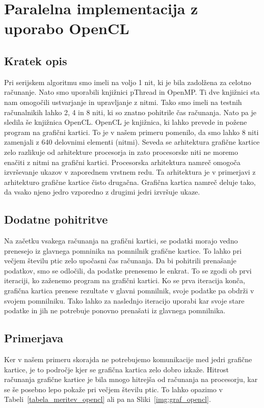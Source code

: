 \documentclass[a4paper, 12pt]{book}
\begin{document}
\chapter{Paralelna implementacija z uporabo OpenCL}
\label{ch4}
\section{Kratek opis}
Pri serijskem algoritmu smo imeli na voljo 1 nit, ki je bila zadolžena za celotno računanje. Nato smo uporabili knjižnici pThread in OpenMP. Ti dve knjižnici sta nam omogočili ustvarjanje in upravljanje z nitmi. Tako smo imeli na testnih računalnikih lahko 2, 4 in 8 niti, ki so znatno pohitrile čas računanja. Nato pa je sledila še knjižnica OpenCL. OpenCL je knjižnica, ki lahko prevede in požene program na grafični kartici. To je v našem primeru pomenilo, da smo lahko 8 niti zamenjali z 640 delovnimi elementi (nitmi). Seveda se arhitektura grafične kartice zelo razlikuje od arhitekture procesorja in zato procesorske niti ne moremo enačiti z nitmi na grafični kartici. Procesorska arhitektura namreč omogoča izvrševanje ukazov v zaporednem vrstnem redu. Ta arhitektura je v primerjavi z arhitekturo grafične kartice čisto drugačna. Grafična kartica namreč deluje tako, da vsako njeno jedro vzporedno z drugimi jedri izvršuje ukaze. 

\section{Dodatne pohitritve}
Na začetku vsakega računanja na grafični kartici, se podatki morajo vedno prenesejo iz glavnega pomninika na pomnilnik grafične kartice. To lahko pri večjem številu ptic zelo upočasni čas računanja. Da bi pohitrili prenašanje podatkov, smo se odločili, da podatke prenesemo le enkrat. To se zgodi ob prvi iteraciji, ko zaženemo program na grafični kartici. Ko se prva iteracija konča, grafična kartica prenese rezultate v glavni pomnilnik, svoje podatke pa obdrži v svojem pomnilniku. Tako lahko za naslednjo iteracijo uporabi kar svoje stare podatke in jih ne potrebuje ponovno prenašati iz glavnega pomnilnika.

\section{Primerjava}
Ker v našem primeru skorajda ne potrebujemo komunikacije med jedri grafične kartice, je to področje kjer se grafična kartica zelo dobro izkaže. Hitrost računanja grafične kartice je bila mnogo hitrejša od računanja na procesorju, kar se še posebno lepo pokaže pri večjem številu ptic. To lahko opazimo v Tabeli~\ref{tabela_meritev_opencl} ali pa na Sliki~\ref{img:graf_opencl}.
\end{document}
